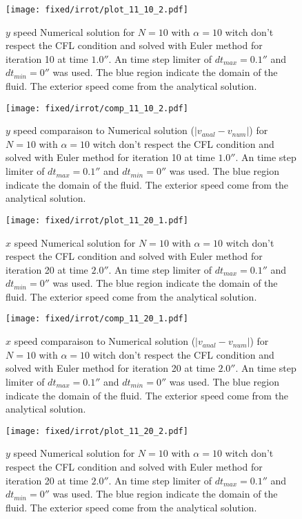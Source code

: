 \begin{figure}
\texttt{[image: fixed/irrot/plot\_11\_10\_2.pdf]}
\caption{$y$ speed Numerical solution for $N=10$ with $\alpha=10$ witch don't respect the CFL condition and solved with Euler method
for iteration 10 at time $\unit{1.0}{\second}$.
An time step limiter of $dt_{max}=\unit{0.1}{\second}$ and $dt_{min}=\unit{0}{\second}$ was used.
The blue region indicate the domain of the fluid. The exterior speed come from the analytical solution.
\label{fix:plot_11_10_2}
}
\end{figure}

\begin{figure}
\texttt{[image: fixed/irrot/comp\_11\_10\_2.pdf]}
\caption{$y$ speed comparaison to Numerical solution ($|v_{anal}-v_{num}|$) for $N=10$ with $\alpha=10$ witch don't respect the CFL condition and solved with Euler method
for iteration 10 at time $\unit{1.0}{\second}$.
An time step limiter of $dt_{max}=\unit{0.1}{\second}$ and $dt_{min}=\unit{0}{\second}$ was used.
The blue region indicate the domain of the fluid. The exterior speed come from the analytical solution.
\label{fix:comp_11_10_2}
}
\end{figure}

\begin{figure}
\texttt{[image: fixed/irrot/plot\_11\_20\_1.pdf]}
\caption{$x$ speed Numerical solution for $N=10$ with $\alpha=10$ witch don't respect the CFL condition and solved with Euler method
for iteration 20 at time $\unit{2.0}{\second}$.
An time step limiter of $dt_{max}=\unit{0.1}{\second}$ and $dt_{min}=\unit{0}{\second}$ was used.
The blue region indicate the domain of the fluid. The exterior speed come from the analytical solution.
\label{fix:plot_11_20_1}
}
\end{figure}

\begin{figure}
\texttt{[image: fixed/irrot/comp\_11\_20\_1.pdf]}
\caption{$x$ speed comparaison to Numerical solution ($|v_{anal}-v_{num}|$) for $N=10$ with $\alpha=10$ witch don't respect the CFL condition and solved with Euler method
for iteration 20 at time $\unit{2.0}{\second}$.
An time step limiter of $dt_{max}=\unit{0.1}{\second}$ and $dt_{min}=\unit{0}{\second}$ was used.
The blue region indicate the domain of the fluid. The exterior speed come from the analytical solution.
\label{fix:comp_11_20_1}
}
\end{figure}

\clearpage

\begin{figure}
\texttt{[image: fixed/irrot/plot\_11\_20\_2.pdf]}
\caption{$y$ speed Numerical solution for $N=10$ with $\alpha=10$ witch don't respect the CFL condition and solved with Euler method
for iteration 20 at time $\unit{2.0}{\second}$.
An time step limiter of $dt_{max}=\unit{0.1}{\second}$ and $dt_{min}=\unit{0}{\second}$ was used.
The blue region indicate the domain of the fluid. The exterior speed come from the analytical solution.
\label{fix:plot_11_20_2}
}
\end{figure}

